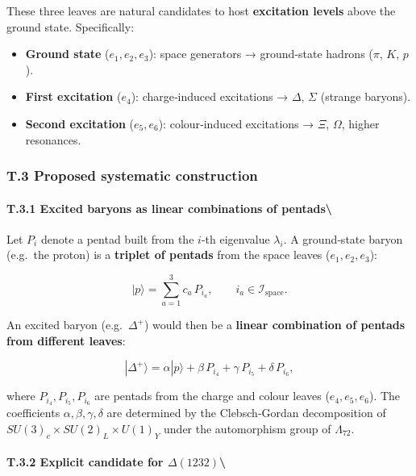 \documentclass[11pt]{article}
\providecommand{\tightlist}{\setlength{\itemsep}{2pt}\setlength{\parskip}{6pt}}
\let\oldmathcal\mathcal
\renewcommand{\mathcal}[1]{\oldmathcal{#1}}
\providecommand{\tightlist}{%
  \setlength{\itemsep}{2pt}\setlength{\parskip}{6pt}
}
\begin{document}
These three leaves are natural candidates to host \textbf{excitation
levels} above the ground state. Specifically:

\begin{itemize}
\tightlist
\item
  \textbf{Ground state} (\(e_1, e_2, e_3\)): space generators →
  ground‑state hadrons (\(\pi\), \(K\), \(p\)).
\item
  \textbf{First excitation} (\(e_4\)): charge‑induced excitations →
  \(\Delta\), \(\Sigma\) (strange baryons).
\item
  \textbf{Second excitation} (\(e_5, e_6\)): colour‑induced excitations
  → \(\Xi\), \(\Omega\), higher resonances.
\end{itemize}

\hypertarget{t.3-proposed-systematic-construction}{%
\subsubsection{T.3 Proposed systematic
construction}\label{t.3-proposed-systematic-construction}}

\hypertarget{t.3.1-excited-baryons-as-linear-combinations-of-pentads}{%
\paragraph{T.3.1 Excited baryons as linear combinations of
pentads\textbackslash{}}\label{t.3.1-excited-baryons-as-linear-combinations-of-pentads}}

Let \(P_i\) denote a pentad built from the \(i\)-th eigenvalue
\(\lambda_i\). A ground‑state baryon (e.g.~the proton) is a
\textbf{triplet of pentads} from the space leaves (\(e_1,e_2,e_3\)):

\[
|p\rangle = \sum_{a=1}^{3} c_a \, P_{i_a}, \qquad i_a \in \mathcal{I}_{\text{space}}.
\]

An excited baryon (e.g.~\(\Delta^+\)) would then be a \textbf{linear
combination of pentads from different leaves}:

\[
|\Delta^+\rangle = \alpha |p\rangle + \beta \, P_{i_4} + \gamma \, P_{i_5} + \delta \, P_{i_6},
\]

where \(P_{i_4}, P_{i_5}, P_{i_6}\) are pentads from the charge and
colour leaves (\(e_4, e_5, e_6\)). The coefficients
\(\alpha,\beta,\gamma,\delta\) are determined by the Clebsch‑Gordan
decomposition of \(SU(3)_c \times SU(2)_L \times U(1)_Y\) under the
automorphism group of \(\Lambda_{72}\).

\hypertarget{t.3.2-explicit-candidate-for-delta1232}{%
\paragraph{\texorpdfstring{T.3.2 Explicit candidate for
\(\Delta(1232)\)\textbackslash{}}{T.3.2 Explicit candidate for \textbackslash Delta(1232)\textbackslash{}}}\label{t.3.2-explicit-candidate-for-delta1232}}
\end{document}
